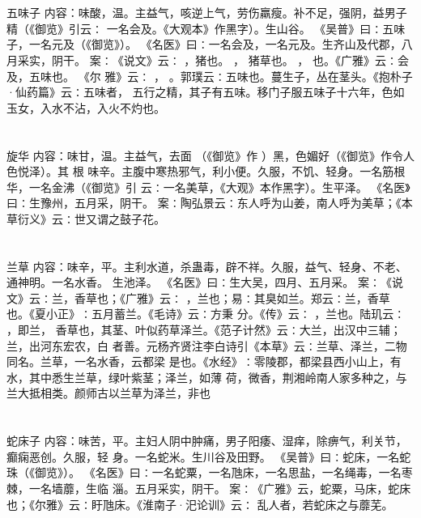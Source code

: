 \documentclass[12pt,UTF8]{ctexbook}
\begin{document}
\chapter{}五味子
内容：味酸，温。主益气，咳逆上气，劳伤羸瘦。补不足，强阴，益男子精（《御览》引云∶ 
一名会及。《大观本》作黑字）。生山谷。 
《吴普》曰∶五味子，一名元及（《御览》）。 
《名医》曰∶一名会及，一名元及。生齐山及代郡，八月采实，阴干。 
案∶《说文》云∶ ，猪也。 ， 猪草也。 ， 也。《广雅》云∶会及，五味也。 
《尔 
雅》云∶ ， 。郭璞云∶五味也。蔓生子，丛在茎头。《抱朴子·仙药篇》云∶五味者， 
五行之精，其子有五味。移门子服五味子十六年，色如玉女，入水不沾，入火不灼也。 


\chapter{}旋华
内容：味甘，温。主益气，去面 （《御览》作 ）黑，色媚好（《御览》作令人色悦泽）。其 
根 
味辛。主腹中寒热邪气，利小便。久服，不饥、轻身。一名筋根华，一名金沸（《御览》引 
云∶一名美草，《大观》本作黑字）。生平泽。 
《名医》曰∶生豫州，五月采，阴干。 
案∶陶弘景云∶东人呼为山姜，南人呼为美草；《本草衍义》云∶世又谓之鼓子花。 


\chapter{}兰草
内容：味辛，平。主利水道，杀蛊毒，辟不祥。久服，益气、轻身、不老、通神明。一名水香。 
生池泽。 
《名医》曰∶生大吴，四月、五月采。 
案∶《说文》云∶兰，香草也；《广雅》云∶ ，兰也；易∶其臭如兰。郑云∶兰，香草 
也。《夏小正》∶五月蓄兰。《毛诗》云∶方秉 分。《传》云∶ ，兰也。陆玑云∶ ，即兰， 
香草也，其茎、叶似药草泽兰。《范子计然》云∶大兰，出汉中三辅；兰，出河东宏农，白 
者善。元杨齐贤注李白诗引《本草》云∶兰草、泽兰，二物同名。兰草，一名水香，云都梁 
是也。《水经》∶零陵郡，都梁县西小山上，有 水，其中悉生兰草，绿叶紫茎；泽兰，如薄 
荷，微香，荆湘岭南人家多种之，与兰大抵相类。颜师古以兰草为泽兰，非也 


\chapter{}蛇床子
内容：味苦，平。主妇人阴中肿痛，男子阳痿、湿痒，除痹气，利关节，癫痫恶创。久服，轻 
身。一名蛇米。生川谷及田野。 
《吴普》曰∶蛇床，一名蛇珠（《御览》）。 
《名医》曰∶一名蛇粟，一名虺床，一名思盐，一名绳毒，一名枣棘，一名墙蘼，生临 
淄。五月采实，阴干。 
案∶《广雅》云，蛇粟，马床，蛇床也；《尔雅》云∶盱虺床。《淮南子·汜论训》云∶ 
乱人者，若蛇床之与蘼芜。 
\end{document}
